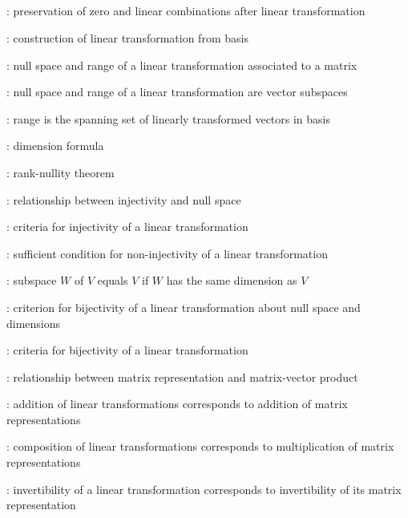 \subsection*{}
\item {}: preservation of zero and linear combinations after linear transformation
\item {}: construction of linear transformation from basis
\item {}: null space and range of a linear transformation associated to a matrix
\item {}: null space and range of a linear transformation are vector subspaces
\item {}: range is the spanning set of linearly transformed vectors in basis
\item {}: dimension formula
\item {}: rank-nullity theorem
\item {}: relationship between injectivity and null space
\item {}: criteria for injectivity of a linear transformation
\item {}: sufficient condition for non-injectivity of a linear transformation
\item {}: subspace \(W\) of \(V\) equals \(V\) if \(W\) has the same dimension as \(V\)
\item {}: criterion for bijectivity of a linear transformation about null space and dimensions
\item {}: criteria for bijectivity of a linear transformation
\item {}: relationship between matrix representation and matrix-vector product
\item {}: addition of linear transformations
corresponds to addition of matrix representations
\item {}: composition of linear transformations
corresponds to multiplication of matrix representations
\item {}: invertibility of a linear transformation
corresponds to invertibility of its matrix representation
